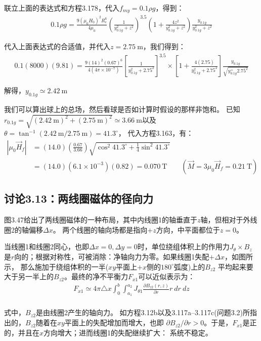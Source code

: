 联立上面的表达式和方程3.178，代入$f_{my}=0.1\rho g$，得到：
\begin{align*}
0.1\rho g=\frac{9(\mu_0 H_0)^2R_e^6}{4\mu_0}(\frac{1}{y_{0.1g}^2+z^2})^{3.5}(1+\frac{4z^2}{y_{0.1g}^2+z^2})\frac{y_{0.1g}}{y_{0.1g}^2+z^2}
\end{align*}

代入上面表达式的合适值，并代入$z=2.75\ \mathrm{m}$，我们得到：
\begin{align*}
0.1(8000)(9.81)=\frac{9(14)^2(0.67)^6}{4(4\pi\times 10^{-7})}[\frac{1}{y_{0.1g}^2+2.75^2}]^{3.5}\times[1+\frac{4(2.75)}{y_{0.1g}^2+2.75^2}]\frac{y_{0.1g}}{\sqrt{y_{0.1g}^+2.75^2}}
\end{align*}

解得，$y_{0.1g}\simeq 2.42\ \mathrm{m}$

我们可以算出球上的总场，然后看球是否如计算时假设的那样非饱和。
已知$r_{0.1g} =\sqrt{(2.42 \ \mathrm{m})^2+(2.75\ \mathrm{m})^2}\simeq 3.66 \ \mathrm{m}$以及$\theta = \tan^{−1}(2.42\ \mathrm{m}/2.75\ \mathrm{m}) = 41.3^\circ$，
代入方程3.163，有：
\begin{align*}
|\mu_0 \vec{H}_f|&=(14.0)(\frac{0.67}{3.66})\sqrt{\cos^2 41.3^\circ+\frac{1}{4}\sin^2 41.3^\circ}\\
&=(14.0)(6.1\times 10^{-3})(0.82)=0.070\ \mathrm{T}\qquad(\vec{M}=3\mu_0\vec{H}_f=0.21\ \mathrm{T})
\end{align*}


\subsection{讨论3.13：两线圈磁体的径向力}
图3.47给出了两线圈磁体的一种布局，其中内线圈1的轴垂直于$z$轴，但相对于外线圈2的轴偏移$\Delta x$。
两个线圈的轴向场都是指向$+z$方向，中平面都位于$z=0$。

当线圈1和线圈2同心，也即$\Delta x=0,\Delta y=0$时，单位绕组体积上的作用力$J_\theta \times B_z$
是$r$向的；根据对称性，可被消除：净轴向力为零。如果线圈1失配$+\Delta x$，如图所示，
那么施加于绕组体积的一半($xy$平面上$+x$侧的$180^\circ$弧度)上的$B_{z2}$
平均起来要大于另一半上的$B_{z2}$。最终的净不平衡力$F_{x1}$可以近似表示为：
\begin{align}%
F_{x1}\simeq 4\pi\triangle x\int_{0}^{b}\int_{a_{1}}^{a_{2}}J_{\theta1}\frac{\partial B_{z2}(r,z)}{\partial r}r\ dr\ dz\\
\end{align}

式中，$B_{z2}$是由线圈2产生的轴向力。
如方程3.12b以及3.117a–3.117c(问题3.2)所指出的，$B_{z2}$随着在$xy$平面上的失配增加而增大，也即
$\partial B_{z2}/\partial r>0$。于是，$F_{x1}$是正的，并且在$x$方向增大；进而线圈1的失配继续扩大：
系统不稳定。

